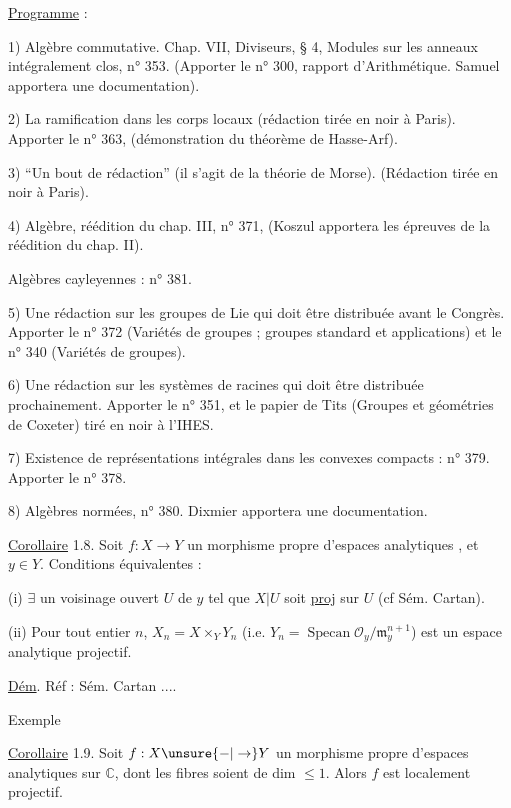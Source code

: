 \uline{Programme} :

1) Algèbre commutative. Chap. VII, Diviseurs, § 4, Modules sur les anneaux intégralement clos, n° 353. (Apporter le n° 300, rapport d'Arithmétique. Samuel apportera une documentation).

2) La ramification dans les corps locaux (rédaction tirée en noir à Paris). Apporter le n° 363, (démonstration du théorème de Hasse-Arf).

3) ``Un bout de rédaction'' (il s'agit de la théorie de Morse). (Rédaction tirée en noir à Paris).

4) Algèbre, réédition du chap. III, n° 371, (Koszul apportera les épreuves de la réédition du chap. II).

Algèbres cayleyennes : n° 381.

5) Une rédaction sur les groupes de Lie qui doit être distribuée avant le Congrès. Apporter le n° 372 (Variétés de groupes ; groupes standard et applications) et le n° 340 (Variétés de groupes).

6) Une rédaction sur les systèmes de racines qui doit être distribuée prochainement. Apporter le n° 351, et le papier de Tits (Groupes et géométries de Coxeter) tiré en noir à l'IHES.

7) Existence de représentations intégrales dans les convexes compacts : n° 379. Apporter le n° 378.

8) Algèbres normées, n° 380. Dixmier apportera une documentation.


\uline{Corollaire} 1.8. Soit $f:X\to Y$ un morphisme propre d'espaces analytiques , et $y\in Y$. Conditions équivalentes :

(i) $\exists$ un voisinage ouvert $U$ de $y$ tel que $X|U$ soit \uline{proj} sur $U$ (cf Sém. Cartan).

(ii) Pour tout entier $n$, $X_n=X\times_Y Y_n$ (i.e. $Y_n=\operatorname{Specan}\mathcal O_y/\mathfrak m_y^{n+1}$) est  un espace analytique projectif.

\uline{Dém}. Réf : Sém. Cartan ....

Exemple

\uline{Corollaire}  1.9.  Soit $f:X\unsure{-|\to}Y$ un morphisme propre d'espaces analytiques sur $\mathbb C$,  dont les fibres soient de dim $\leq 1$. Alors $f$ est localement projectif.

